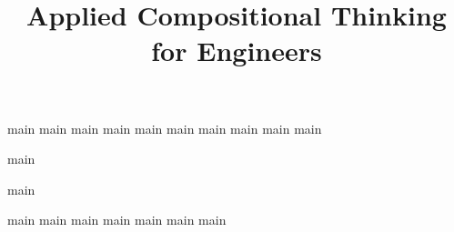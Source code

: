 \pagestyle{scrheadings}

\ohead{\pagemark}
\ihead{\headmark}
\cfoot{}
\dominitoc
\doparttoc
\setcounter{parttocdepth}{0}
\setcounter{minitocdepth}{1}

\title{Applied Compositional Thinking\\ for Engineers}
\date{}





\setcounter{tocdepth}{1}



\tableofcontents


{main}
{main}
{main}
{main}
{main}
{main}
{main}
{main}
{main}
{main}

{main}

{main}

{main}
{main}
{main}
{main}
{main}
{main}
{main}


